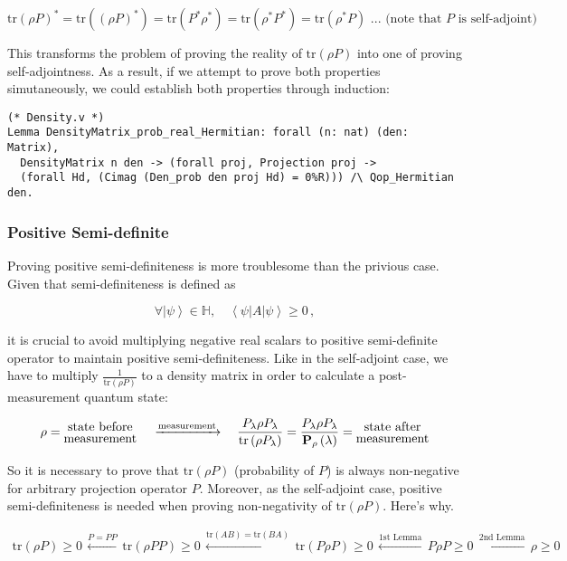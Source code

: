 \documentclass[10pt,a4paper]{article}
\newcommand{\<}{\langle}
\renewcommand{\>}{\rangle}
\newcommand{\prths}[1]{\left( #1 \right)}
\newcommand{\tr}[1]{\textrm{tr} \left( #1 \right)}
\newcommand{\bra}[1]{\left\< #1 \right\vert}
\newcommand{\ket}[1]{\left\vert #1 \right\>}
\begin{document}
$$
\tr{\rho P}^* = \tr{\prths{\rho P}^*} =
\tr{P^* \rho^*} =
\tr{\rho^* P^*} =
\tr{\rho^* P} \textrm{ ... (note that $P$ is self-adjoint)}
$$

This transforms the problem of proving the reality of $\tr{\rho P}$ into one of
proving self-adjointness. As a result, if we attempt to prove both properties
simutaneously, we could establish both properties through induction:

\begin{lstlisting}
(* Density.v *)
Lemma DensityMatrix_prob_real_Hermitian: forall (n: nat) (den: Matrix),
  DensityMatrix n den -> (forall proj, Projection proj ->
  (forall Hd, (Cimag (Den_prob den proj Hd) = 0%R))) /\ Qop_Hermitian den.
\end{lstlisting}


\subsubsection{Positive Semi-definite}

Proving positive semi-definiteness is more troublesome than the privious case.
Given that semi-definiteness is defined as

$$
  \forall \ket{\psi} \in \mathbb{H}, \quad \bra{\psi} A \ket{\psi} \ge 0 \, ,
$$

it is crucial to avoid multiplying negative real scalars to positive semi-definite
operator to maintain positive semi-definiteness.
Like in the self-adjoint case, we have to multiply $\frac{1}{\tr{\rho
P}}$ to a density matrix in order to calculate a post-measurement quantum state:

$$
\rho = \stackanchor{\textrm{state before}}{\textrm{measurement}}
\quad \, \xrightarrow{\textrm{measurement}} \quad
\frac{P_\lambda \rho P_\lambda}{\tr{\rho P_\lambda}}
= \frac{P_\lambda \rho P_\lambda}{\textbf{P}_\rho \prths{\lambda}}
= \stackanchor{\textrm{state after}}{\textrm{measurement}}
$$

So it is necessary to prove that $\tr{\rho P}$ (probability of $P$)
is always non-negative for arbitrary projection operator $P$.
Moreover, as the self-adjoint case, positive semi-definiteness is needed when
proving non-negativity of $\tr{\rho P}$.
Here's why.

\begin{multline*}
\tr{\rho P} \ge 0
\, \xleftarrow{P = P P} \,
\tr{\rho P P} \ge 0
\, \xleftarrow{\tr{AB} = \tr{BA}} \,
\tr{P \rho P} \ge 0
\, \xleftarrow{\textrm{1st Lemma}} \,
{P \rho P} \ge 0
\, \xleftarrow{\textrm{2nd Lemma}} \,
\rho \ge 0
\end{multline*}
\end{document}
